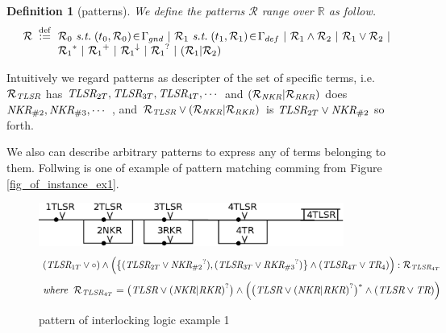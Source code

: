 \documentclass[12pt]{article}
\newtheorem{Definition}{Definition}[section]
\begin{document}
\begin{Definition}[patterns]
  We define the patterns $\mathcal{R}$ range over $\mathbb{R}$ as follow.
  \[ \mathcal{R} \;\stackrel{\mathrm{def}}{:=}\!
  \begin{array}[t]{l}
    \mathcal{R}_0 \ \text{\it s.t.}\; (t_0, \mathcal{R}_0) \!\in\!
     \Gamma_{gnd}\ |\ 
    \mathcal{R}_1\ \text{\it s.t.}\; (t_1, \mathcal{R}_1) \!\in\!
     \Gamma_{def}\ |\
    \mathcal{R}_1 \wedge \mathcal{R}_2 \ |\
     \mathcal{R}_1 \vee \mathcal{R}_2 \ |  \\
    {\mathcal{R}_1}^* \ |\ {\mathcal{R}_1}^+ \ |\
    {\mathcal{R}_1}^\downarrow \ |\ {\mathcal{R}_1}^? \ |\
    (\mathcal{R}_1 | \mathcal{R}_2)
  \end{array}
  \]
\end{Definition}

Intuitively we regard patterns as descripter of the set of specific terms,
i.e. $\mathcal{R}_{\text{\it TLSR}}$ has
$\text{\it TLSR}_{2T}, \text{\it TLSR}_{3T}, \text{\it TLSR}_{4T}, \cdots$
and $(\mathcal{R}_{\text{\it NKR}} | \mathcal{R}_{\text{\it RKR}})$ does
$\text{\it NKR}_{\#2}, \text{\it NKR}_{\#3}, \cdots$ , and
$\mathcal{R}_{\text{\it TLSR}} \vee (\mathcal{R}_{\text{\it NKR}} |
\mathcal{R}_{\text{\it RKR}})$ is 
$\text{\it TLSR}_{2T} \vee \text{\it NKR}_{\#2}$ so forth.

We also can describe arbitrary patterns to express any of terms belonging
to them. Follwing is one of example of pattern matching comming from
Figure \ref{fig_of_instance_ex1}.

\begin{figure}[htbp]
  \begin{center}
    \includegraphics[keepaspectratio, width=100mm]{fig1.eps}
    \begin{displaymath}
      (\text{\it TLSR}_{1T} \vee \circ) \wedge \Bigl(\bigl\{(
      \text{\it TLSR}_{2T} \vee {\text{\it NKR}_{\#2}}^?),
      (\text{\it TLSR}_{3T} \vee {\text{\it RKR}_{\#3}}^?)\bigr\} \wedge
      (\text{\it TLSR}_{4T} \vee \text{\it TR}_{4}) \Bigr) :
      \mathcal{R}_{\text{\it TLSR}_{4T}}
    \end{displaymath}
    \begin{displaymath}
      \text{\it where}\;\; \mathcal{R}_{\text{\it TLSR}_{4T}} =
      \bigl(\text{\it TLSR} \vee {(\text{\it NKR} | \text{\it RKR})}^?
      \bigr) \wedge \Bigl(\bigl(\text{\it TLSR} \vee
      {(\text{\it NKR} | \text{\it RKR})}^? \bigr)^* \wedge
      (\text{\it TLSR} \vee \text{\it TR}) \Bigr)
    \end{displaymath}
    \caption{pattern of interlocking logic example 1}
    \label{fig_of_pattern_ex1}
  \end{center}
\end{figure}
\end{document}
